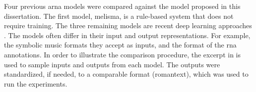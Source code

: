 
Four previous \gls{arna} models were compared against the
model proposed in this dissertation. The first model,
\gls{melisma}, is a rule-based system that does not require
training. The three remaining models are recent deep
learning approaches \parencite{chen2021attend,
micchi2021deep, mcleod2021modular}. The models often differ
in their input and output representations. For example, the
symbolic music formats they accept as inputs, and the format
of the \gls{rna} annotations. In order to illustrate the
comparison procedure, the excerpt in  is
used to sample inputs and outputs from each model. The
outputs were standardized, if needed, to a comparable format
(\gls{romantext}), which was used to run the experiments.

